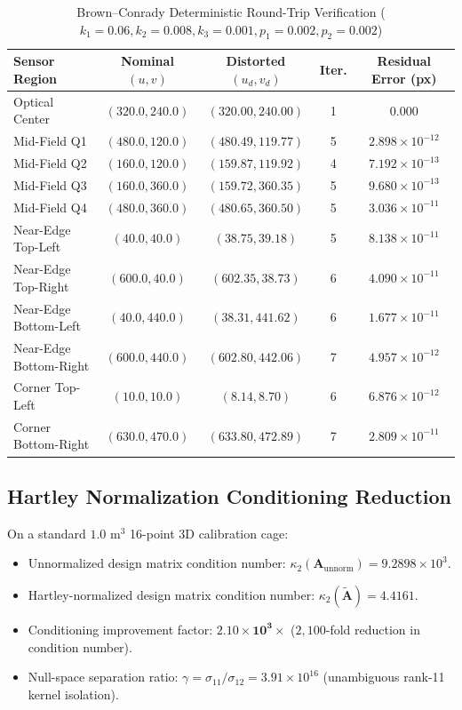 \documentclass[journal]{IEEEtran}
\begin{document}
\begin{table}[!t]
\caption{Brown--Conrady Deterministic Round-Trip Verification ($k_1=0.06, k_2=0.008, k_3=0.001, p_1=0.002, p_2=0.002$)}
\label{tab:bc_roundtrip}
\centering
\begin{tabular}{lcccc}\toprule
\textbf{Sensor Region} & \textbf{Nominal $(u, v)$} & \textbf{Distorted $(u_d, v_d)$} & \textbf{Iter.} & \textbf{Residual Error (px)} \\\midrule
Optical Center & $(320.0, 240.0)$ & $(320.00, 240.00)$ & 1 & $0.000$ \\
Mid-Field Q1 & $(480.0, 120.0)$ & $(480.49, 119.77)$ & 5 & $2.898 \times 10^{-12}$ \\
Mid-Field Q2 & $(160.0, 120.0)$ & $(159.87, 119.92)$ & 4 & $7.192 \times 10^{-13}$ \\
Mid-Field Q3 & $(160.0, 360.0)$ & $(159.72, 360.35)$ & 5 & $9.680 \times 10^{-13}$ \\
Mid-Field Q4 & $(480.0, 360.0)$ & $(480.65, 360.50)$ & 5 & $3.036 \times 10^{-11}$ \\
Near-Edge Top-Left & $(40.0, 40.0)$ & $(38.75, 39.18)$ & 5 & $8.138 \times 10^{-11}$ \\
Near-Edge Top-Right & $(600.0, 40.0)$ & $(602.35, 38.73)$ & 6 & $4.090 \times 10^{-11}$ \\
Near-Edge Bottom-Left & $(40.0, 440.0)$ & $(38.31, 441.62)$ & 6 & $1.677 \times 10^{-11}$ \\
Near-Edge Bottom-Right & $(600.0, 440.0)$ & $(602.80, 442.06)$ & 7 & $4.957 \times 10^{-12}$ \\
Corner Top-Left & $(10.0, 10.0)$ & $(8.14, 8.70)$ & 6 & $6.876 \times 10^{-12}$ \\
Corner Bottom-Right & $(630.0, 470.0)$ & $(633.80, 472.89)$ & 7 & $2.809 \times 10^{-11}$ \\\bottomrule
\end{tabular}
\end{table}

\subsection{Hartley Normalization Conditioning Reduction}
On a standard $1.0\text{ m}^3$ 16-point 3D calibration cage:
\begin{itemize}
    \item Unnormalized design matrix condition number: $\kappa_2(\mathbf{A}_{\mathrm{unnorm}}) = 9.2898 \times 10^3$.
    \item Hartley-normalized design matrix condition number: $\kappa_2(\tilde{\mathbf{A}}) = \mathbf{4.4161}$.
    \item Conditioning improvement factor: $\mathbf{2.10 \times 10^3\times}$ ($2,100$-fold reduction in condition number).
    \item Null-space separation ratio: $\gamma = \sigma_{11}/\sigma_{12} = 3.91 \times 10^{16}$ (unambiguous rank-11 kernel isolation).
\end{itemize}
\end{document}
